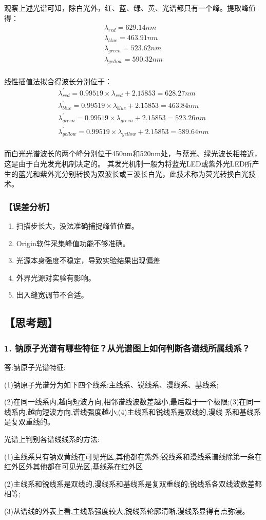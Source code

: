 \documentclass[12pt,a4paper,UTF8]{ctexart}
\begin{document}
观察上述光谱可知，除白光外，红、蓝、绿、黄、光谱都只有一个峰。提取峰值得：
\begin{gather*}
	\lambda_{red}=629.14nm\\
	\lambda_{blue}=463.91nm\\
	\lambda_{green}=523.62nm\\
	\lambda_{yellow}=590.32nm\\
\end{gather*}

线性插值法拟合得波长分别位于：
\begin{gather*}
	\lambda^{'}_{red}=0.99519\times\lambda_{red}+2.15853=628.27nm\\
	\lambda^{'}_{blue}=0.99519\times\lambda_{blue}+2.15853=463.84nm\\
	\lambda^{'}_{green}=0.99519\times\lambda_{green}+2.15853=523.26nm\\
	\lambda^{'}_{yellow}=0.99519\times\lambda_{yellow}+2.15853=589.64nm\\
\end{gather*}

而白光光谱波长的两个峰分别位于450nm和520nm处，与蓝光、绿光波长相接近，这是由于白光发光机制决定的。
其发光机制一般为将蓝光LED或紫外光LED所产生的蓝光和紫外光分别转换为双波长或三波长白光，此技术称为荧光转换白光技术。


\subsubsection*{【误差分析】}
\begin{enumerate}
	\item 扫描步长大，没法准确捕捉峰值位置。
	\item Origin软件采集峰值功能不够准确。
	\item 光源本身强度不稳定，导致实验结果出现偏差
	\item 外界光源对实验有影响。
	\item 出入缝宽调节不合适。
\end{enumerate}






\newpage
\subsection*{【思考题】}
\subsubsection*{1. 钠原子光谱有哪些特征？从光谱图上如何判断各谱线所属线系？}
答:钠原子光谱特征:

(1)钠原子光谱分为如下四个线系:主线系、锐线系、漫线系、基线系;

(2)在同一线系内,越向短波方向,相邻谱线波数差越小,最后趋于一个极限;(3)在同一线系内,越向短波方向,谱线强度越小;(4)主线系和锐线系是双线的,漫线
系和基线系是复双重线的。

光谱上判别各谱线线系的方法:

(1)主线系只有钠双黄线在可见光区,其他都在紫外;锐线系和漫线系谱线除第一条在红外区外其他都在可见光区,基线系在红外区

(2)主线系和锐线系是双线的,漫线系和基线系是复双重线的;锐线系各双线波数差都相等;

(3)从谱线的外表上看,主线系强度较大,锐线系轮廓清晰,漫线系显得有点弥漫。
\end{document}
